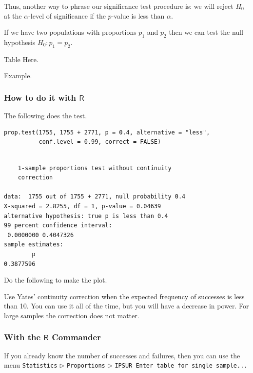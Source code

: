 \documentclass[captions=tableheading]{scrbook}
\begin{document}
Thus, another way to phrase our significance test procedure is: we will reject \(H_{0}\) at the \(\alpha\)-level of significance if the \(p\)-value is less than \(\alpha\).

\begin{rem}
If we have two populations with proportions \(p_{1}\) and \(p_{2}\) then we can test the null hypothesis \(H_{0}:p_{1}=p_{2}\).
\end{rem}

Table Here.

\begin{example}
Example.
\end{example}
\subsubsection{How to do it with \(\mathsf{R}\)}
\label{sec-10-2-1-1}


The following does the test.


\lstset{language=R}
\begin{lstlisting}
prop.test(1755, 1755 + 2771, p = 0.4, alternative = "less", 
          conf.level = 0.99, correct = FALSE)
\end{lstlisting}


\begin{verbatim}

	1-sample proportions test without continuity
	correction

data:  1755 out of 1755 + 2771, null probability 0.4 
X-squared = 2.8255, df = 1, p-value = 0.04639
alternative hypothesis: true p is less than 0.4 
99 percent confidence interval:
 0.0000000 0.4047326 
sample estimates:
        p 
0.3877596
\end{verbatim}

Do the following to make the plot.


Use Yates' continuity correction when the expected frequency of successes is less than 10. You can use it all of the time, but you will have a decrease in power. For large samples the correction does not matter. 
\subsubsection{With the \(\mathsf{R}\) Commander}
\label{sec-10-2-1-2}


If you already know the number of successes and failures, then you can use the menu \texttt{Statistics} \(\triangleright\) \texttt{Proportions} \(\triangleright\) \texttt{IPSUR Enter table for single sample...}
\end{document}
